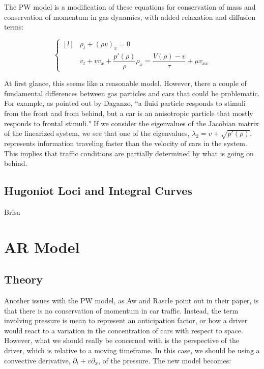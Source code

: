 \documentclass{article}
\begin{document}
The PW model is a modification of these equations for conservation of mass and conservation of momentum in gas dynamics, with added relaxation and diffusion terms: 

\[ \left\{ \begin{matrix*}[l] & \rho_t + (\rho v)_x = 0 \\[1ex] & v_t + v v_x + \dfrac{p'(\rho)}{\rho} \rho_x = \dfrac{V(\rho) - v}{\tau} + \mu v_{xx} \end{matrix*} \right. \]

At first glance, this seems like a reasonable model.  However, there a couple of fundamental differences between gas particles and cars that could be problematic.  For example, as pointed out by Daganzo, ``a fluid particle responds to stimuli from the front and from behind, but a car is an anisotropic particle that mostly responds to frontal stimuli."  If we consider the eigenvalues of the Jacobian matrix of the linearized system, we see that one of the eigenvalues, $\lambda_2 = v + \sqrt{p'(\rho)}$, represents information traveling faster than the velocity of cars in the system.  This implies that traffic conditions are partially determined by what is going on behind.

\subsection{Hugoniot Loci and Integral Curves}
Brisa

\section{AR Model}

\subsection{Theory}
Another issues with the PW model, as Aw and Rascle point out in their paper, is that there is no conservation of momentum in car traffic.  Instead, the term involving pressure is mean to represent an anticipation factor, or how a driver would react to a variation in the concentration of cars with respect to space.   However, what we should really be concerned with is the perspective of the driver, which is relative to a moving timeframe.  In this case, we should be using a convective derivative, $\partial_t + v \partial_x$, of the pressure.  The new model becomes:
\end{document}

